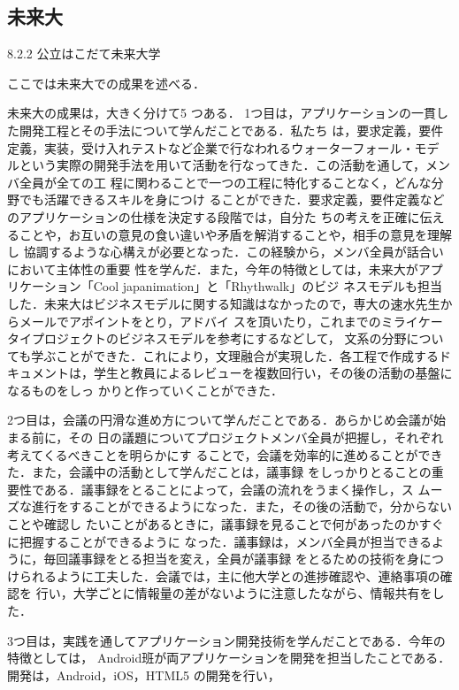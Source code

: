 \subsection{未来大}
\par
8.2.2 公立はこだて未来大学
\par
ここでは未来大での成果を述べる．
\par
未来大の成果は，大きく分けて5 つある．
1つ目は，アプリケーションの一貫した開発工程とその手法について学んだことである．私たち
は，要求定義，要件定義，実装，受け入れテストなど企業で行なわれるウォーターフォール・モデ
ルという実際の開発手法を用いて活動を行なってきた．この活動を通して，メンバ全員が全ての工
程に関わることで一つの工程に特化することなく，どんな分野でも活躍できるスキルを身につけ
ることができた．要求定義，要件定義などのアプリケーションの仕様を決定する段階では，自分た
ちの考えを正確に伝えることや，お互いの意見の食い違いや矛盾を解消することや，相手の意見を理解し
協調するような心構えが必要となった．この経験から，メンバ全員が話合いにおいて主体性の重要
性を学んだ．また，今年の特徴としては，未来大がアプリケーション「Cool japanimation」と「Rhythwalk」のビジ
ネスモデルも担当した．未来大はビジネスモデルに関する知識はなかったので，専大の速水先生からメールでアポイントをとり，アドバイ
スを頂いたり，これまでのミライケータイプロジェクトのビジネスモデルを参考にするなどして，
文系の分野についても学ぶことができた．これにより，文理融合が実現した．各工程で作成するド
キュメントは，学生と教員によるレビューを複数回行い，その後の活動の基盤になるものをしっ
かりと作っていくことができた．
\par
2つ目は，会議の円滑な進め方について学んだことである．あらかじめ会議が始まる前に，その
日の議題についてプロジェクトメンバ全員が把握し，それぞれ考えてくるべきことを明らかにす
ることで，会議を効率的に進めることができた．また，会議中の活動として学んだことは，議事録
をしっかりとることの重要性である．議事録をとることによって，会議の流れをうまく操作し，ス
ムーズな進行をすることができるようになった．また，その後の活動で，分からないことや確認し
たいことがあるときに，議事録を見ることで何があったのかすぐに把握することができるように
なった．議事録は，メンバ全員が担当できるように，毎回議事録をとる担当を変え，全員が議事録
をとるための技術を身につけられるように工夫した．会議では，主に他大学との進捗確認や、連絡事項の確認を
行い，大学ごとに情報量の差がないように注意したながら、情報共有をした．
\par
3つ目は，実践を通してアプリケーション開発技術を学んだことである．今年の特徴としては，
Android班が両アプリケーションを開発を担当したことである．開発は，Android，iOS，HTML5 の開発を行い，
